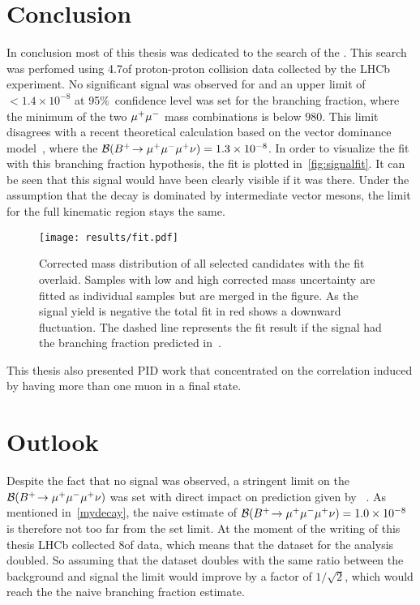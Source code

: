 \section{Conclusion}
In conclusion most of this thesis was dedicated to the search of the \Bmumumu.
This search was perfomed using 4.7\invfb of proton-proton collision data collected by the \gls{LHCb} experiment. No significant signal was observed for \Bmumumu and an upper limit of $< 1.4\times 10^{-8}$ at 95\%~confidence level was set for the branching fraction, where the minimum of the two ${\mu^+\mu^-}$ mass combinations is below $980$\mevcc. This limit disagrees with a recent theoretical calculation based on the vector dominance model~\cite{Danilina:2018uzr}, where the $\mathcal{B}({{{B}^+}}\!\rightarrow {\ensuremath{\mu^+\mu^-\mu^+}}\nu)=1.3\times 10^{-8}$. In order to visualize the fit with this branching fraction hypothesis, the fit is plotted in~\autoref{fig:signalfit}. It can be seen that this signal would have been clearly visible if it was there. Under the assumption that the decay is dominated by intermediate vector mesons, the limit for the full kinematic region stays the same.


\begin{figure}[t]
  \centering
  \texttt{[image: results/fit.pdf]}
  \caption{Corrected mass distribution of all selected \Bmumumu
    candidates with the fit overlaid. Samples with low and high
    corrected mass uncertainty are fitted as individual samples but
    are merged in the figure. As the signal yield is negative the total fit
    in red shows a downward fluctuation. The dashed line represents the fit
    result if the signal had the branching fraction predicted in~\cite{Danilina:2018uzr}.}
  \label{fig:signalfit}
\end{figure}


This thesis also presented \gls{PID} work that concentrated on the correlation induced by having more than one muon in a final state.


\section{Outlook}
Despite the fact that no signal was observed, a stringent limit on the $\mathcal{B}({{{B}^+}}\!\rightarrow {\ensuremath{\mu^+\mu^-\mu^+}}\nu)$ was set with direct impact on prediction given by ~\cite{Danilina:2018uzr}. As mentioned in~\autoref{mydecay}, the naive estimate of $\mathcal{B}({{{B}^+}}\!\rightarrow {\ensuremath{\mu^+\mu^-\mu^+}}\nu)=1.0\times 10^{-8}$ is therefore not too far from the set limit. At the moment of the writing of this thesis \gls{LHCb} collected 8\invfb of data, which means that the dataset for the analysis doubled. So assuming that the dataset doubles with the same ratio between the background and signal the limit would improve by a factor of $1/\sqrt{2}$, which would reach the the naive branching fraction estimate. 



